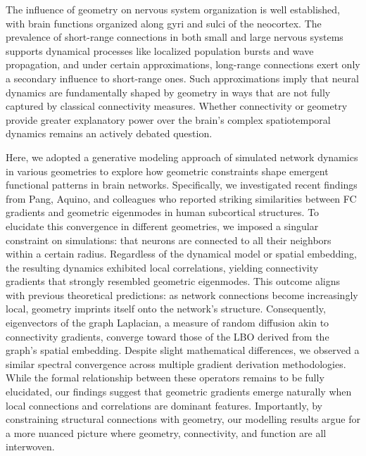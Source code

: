 \documentclass{article}
\begin{document}
The influence of geometry on nervous system organization is well established, with brain functions organized along gyri and sulci of the neocortex\cite{petersen2024principles}. The prevalence of short-range connections in both small\cite{kunst2019cellular} and large nervous systems\cite{ercsey2013predictive} supports dynamical processes like localized population bursts and wave propagation, and under certain approximations, long-range connections exert only a secondary influence to short-range ones\cite{robinson1997propagation}. Such approximations imply that neural dynamics are fundamentally shaped by geometry in ways that are not fully captured by classical connectivity measures\cite{robinson2016eigenmodes, pang2023geometric}. Whether connectivity or geometry provide greater explanatory power over the brain's complex spatiotemporal dynamics remains an actively debated question\cite{pang2023geometric, faskowitz2023commentary, pang2023reply, vohryzek2025human}.

Here, we adopted a generative modeling approach of simulated network dynamics in various geometries to explore how geometric constraints shape emergent functional patterns in brain networks. Specifically, we investigated recent findings from Pang, Aquino, and colleagues who reported striking similarities between FC gradients and geometric eigenmodes in human subcortical structures\cite{pang2023geometric}. To elucidate this convergence in different geometries, we imposed a singular constraint on simulations: that neurons are connected to all their neighbors within a certain radius. Regardless of the dynamical model or spatial embedding, the resulting dynamics exhibited local correlations, yielding connectivity gradients that strongly resembled geometric eigenmodes. This outcome aligns with previous theoretical predictions: as network connections become increasingly local, geometry imprints itself onto the network’s structure\cite{belkin2008towards, GarcaTrillos2019}. Consequently, eigenvectors of the graph Laplacian, a measure of random diffusion akin to connectivity gradients, converge toward those of the LBO derived from the graph's spatial embedding. Despite slight mathematical differences, we observed a similar spectral convergence across multiple gradient derivation methodologies. While the formal relationship between these operators remains to be fully elucidated, our findings suggest that geometric gradients emerge naturally when local connections and correlations are dominant features. Importantly, by constraining structural connections with geometry, our modelling results argue for a more nuanced picture where geometry, connectivity, and function are all interwoven. 
\end{document}
